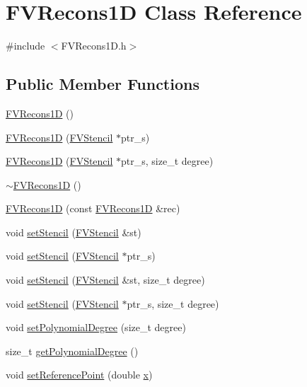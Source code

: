 \hypertarget{classFVRecons1D}{
\section{FVRecons1D Class Reference}
\label{d7/d44/classFVRecons1D}
}


{\ttfamily \#include $<$FVRecons1D.h$>$}

\subsection*{Public Member Functions}
\begin{DoxyCompactItemize}
\item 
\hyperlink{classFVRecons1D_a6146b6ee0af1a92509e45a9261786e93}{FVRecons1D} ()
\item 
\hyperlink{classFVRecons1D_a6a3f5e98edc9b452300f64e12dec81fb}{FVRecons1D} (\hyperlink{classFVStencil}{FVStencil} $\ast$ptr\_\-s)
\item 
\hyperlink{classFVRecons1D_a34b28ffea07632ac9f4927a15d98e8ee}{FVRecons1D} (\hyperlink{classFVStencil}{FVStencil} $\ast$ptr\_\-s, size\_\-t degree)
\item 
\hyperlink{classFVRecons1D_a0b1a51af09a9736dd87796cad9c4409c}{$\sim$FVRecons1D} ()
\item 
\hyperlink{classFVRecons1D_a1b5dd39ac32ef8c0bda1824fc0c087b4}{FVRecons1D} (const \hyperlink{classFVRecons1D}{FVRecons1D} \&rec)
\item 
void \hyperlink{classFVRecons1D_a34d8474a5f5470cab6f077871c7387da}{setStencil} (\hyperlink{classFVStencil}{FVStencil} \&st)
\item 
void \hyperlink{classFVRecons1D_a9fd35e2a4d7096ce3fec84bfc30bf095}{setStencil} (\hyperlink{classFVStencil}{FVStencil} $\ast$ptr\_\-s)
\item 
void \hyperlink{classFVRecons1D_a82cbc1bab2638e760ea3ca50bd393ba6}{setStencil} (\hyperlink{classFVStencil}{FVStencil} \&st, size\_\-t degree)
\item 
void \hyperlink{classFVRecons1D_a6d820346769771af609dbdaa7b1f3021}{setStencil} (\hyperlink{classFVStencil}{FVStencil} $\ast$ptr\_\-s, size\_\-t degree)
\item 
void \hyperlink{classFVRecons1D_a277a64063b5e54974f88aa36f01dd729}{setPolynomialDegree} (size\_\-t degree)
\item 
size\_\-t \hyperlink{classFVRecons1D_a51ced9e32566282ad2c8aa54e23f3cc5}{getPolynomialDegree} ()
\item 
void \hyperlink{classFVRecons1D_ade06e8c8d61be70bf976ab2ee71fe9da}{setReferencePoint} (double \hyperlink{FVL_2FVPoint2D_8h_a9a4f74af87a76a4c3dcb729cb0e68f8d}{x})

\end{DoxyCompactItemize}
